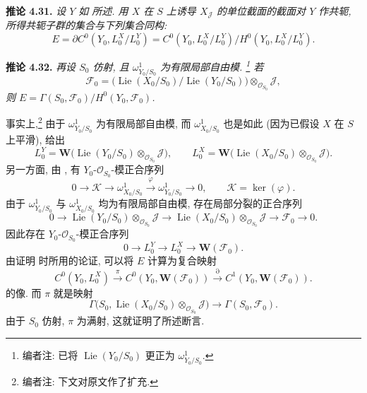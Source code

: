 
\setcounter{footnote}{126}

\medskip
\noindent{}\textbf{推论 4.31.}
\textit{设 \(Y\) 如  所述.
用 \(X\) 在 \(S\) 上诱导 \(X_{\mathscr J}\) 的单位截面的截面对 \(Y\) 作共轭,
所得共轭子群的集合与下列集合同构:}
\[
 E=\partial C^0(Y_0,L_0^X/L_0^Y)
 =C^0(Y_0,L_0^X/L_0^Y)\big/H^0(Y_0,L_0^X/L_0^Y).
\]

\medskip
\noindent{}\textbf{推论 4.32.}
\textit{再设 \(S_0\) 仿射, 且 \(\omega^1_{Y_0/S_0}\) 为有限局部自由模.
\footnote{编者注: 已将 \(\operatorname{Lie}(Y_0/S_0)\)
更正为 \(\omega^1_{Y_0/S_0}\).} 若}
\[
 \mathscr F_0=
 \bigl(\operatorname{Lie}(X_0/S_0)/
       \operatorname{Lie}(Y_0/S_0)\bigr)
 \otimes_{\mathscr O_{S_0}}\mathscr J,
\]
\textit{则 \(E=\Gamma(S_0,\mathscr F_0)/H^0(Y_0,\mathscr F_0)\).}

事实上,\footnote{编者注: 下文对原文作了扩充.}
由于 \(\omega^1_{Y_0/S_0}\) 为有限局部自由模, 而 \(\omega^1_{X_0/S_0}\)
也是如此 (因为已假设 \(X\) 在 \(S\) 上平滑),
 给出
\[
 L_0^Y=\mathbf W\bigl(
   \operatorname{Lie}(Y_0/S_0)\otimes_{\mathscr O_{S_0}}\mathscr J
 \bigr),
 \qquad
 L_0^X=\mathbf W\bigl(
   \operatorname{Lie}(X_0/S_0)\otimes_{\mathscr O_{S_0}}\mathscr J
 \bigr).
\]
另一方面, 由 , 有
\(Y_0\)-\(\mathscr O_{S_0}\)-模正合序列
\[
 0\longrightarrow \mathscr K\longrightarrow \omega^1_{X_0/S_0}
 \xrightarrow{\varphi}\omega^1_{Y_0/S_0}\longrightarrow0,
 \qquad \mathscr K=\ker(\varphi).
\]
由于 \(\omega^1_{Y_0/S_0}\) 与 \(\omega^1_{X_0/S_0}\) 均为有限局部自由模,
存在局部分裂的正合序列
\[
 0\longrightarrow
 \operatorname{Lie}(Y_0/S_0)\otimes_{\mathscr O_{S_0}}\mathscr J
 \longrightarrow
 \operatorname{Lie}(X_0/S_0)\otimes_{\mathscr O_{S_0}}\mathscr J
 \longrightarrow \mathscr F_0\longrightarrow0.
\]
因此存在 \(Y_0\)-\(\mathscr O_{S_0}\)-模正合序列
\[
 0\longrightarrow L_0^Y\longrightarrow L_0^X
 \longrightarrow\mathbf W(\mathscr F_0).
\]
由证明  时所用的论证,
可以将 \(E\) 计算为复合映射
\[
 C^0(Y_0,L_0^X)\xrightarrow{\pi}
 C^0(Y_0,\mathbf W(\mathscr F_0))\xrightarrow{\partial}
 C^1(Y_0,\mathbf W(\mathscr F_0)).
\]
的像. 而 \(\pi\) 就是映射
\[
 \Gamma\bigl(S_0,
   \operatorname{Lie}(X_0/S_0)\otimes_{\mathscr O_{S_0}}\mathscr J
 \bigr)
 \longrightarrow\Gamma(S_0,\mathscr F_0).
\]
由于 \(S_0\) 仿射, \(\pi\) 为满射, 这就证明了所述断言.

